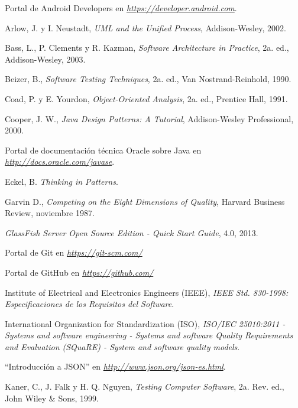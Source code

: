 \begin{thebibliography}{} %
	
	Portal de Android Developers en
	\emph{\url{https://developer.android.com}}.
	
	Arlow, J. y I. Neustadt, 
	\emph{UML and the Unified Process}, 
	Addison-Wesley, 
	2002.
	
	Bass, L., P. Clements y R. Kazman, 
	\emph{Software Architecture in Practice}, 
	2a. ed., 
	Addison-Wesley, 
	2003.
	
	Beizer, B., 
	\emph{Software Testing Techniques}, 
	2a. ed., 
	Van Nostrand-Reinhold, 
	1990.

	Coad, P. y E. Yourdon, 
	\emph{Object-Oriented Analysis}, 
	2a. ed., 
	Prentice Hall, 
	1991.
	
	Cooper, J. W.,
	\emph{Java Design Patterns: A Tutorial}, 
	Addison-Wesley Professional, 
	2000.
	
	Portal de documentación técnica Oracle sobre Java en
	\emph{\url{http://docs.oracle.com/javase}}.
	
	Eckel, B.
	\emph{Thinking in Patterns}.
	
	Garvin D.,
	\emph{Competing on the Eight Dimensions of Quality},
	Harvard Business Review, 
	noviembre 1987.
	
	\emph{GlassFish Server Open Source Edition - Quick Start Guide},
	4.0,
	2013.
	
	Portal de Git en
	\emph{\url{https://git-scm.com/}}
	
	Portal de GitHub en
	\emph{\url{https://github.com/}}
	
	Institute of Electrical and Electronics Engineers (IEEE),
	\emph{IEEE Std. 830-1998: Especificaciones de los Requisitos del Software}.
	
	International Organization for Standardization (ISO),
	\emph{ISO/IEC 25010:2011 - Systems and software engineering - Systems and software Quality Requirements and Evaluation (SQuaRE) - System and software quality models}.
	
	``Introducción a JSON'' en
	\emph{\url{http://www.json.org/json-es.html}}.
	
	Kaner, C., J. Falk y H. Q. Nguyen,
	\emph{Testing Computer Software},
	2a. Rev. ed.,
	John Wiley \& Sons, 
	1999.
	

\end{thebibliography}
